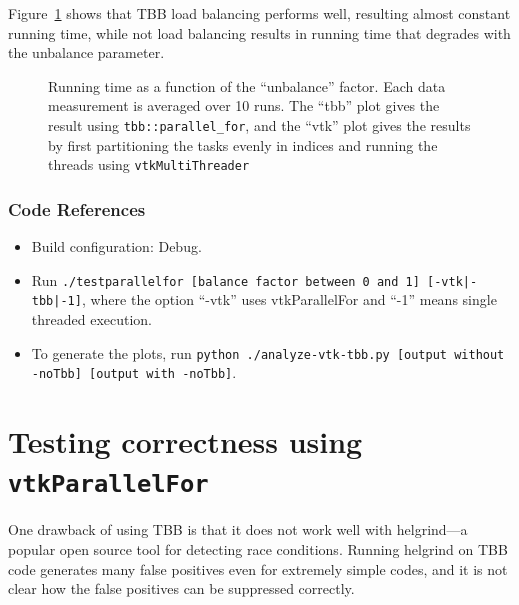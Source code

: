 \documentclass{article}
\begin{document}
Figure~\ref{fig:unbalance} shows that TBB load balancing performs
well, resulting almost constant running time, while not load balancing
results in running time that degrades with the unbalance parameter.
\begin{figure}[H]
\caption{Running time as a function of the ``unbalance'' factor.  Each
  data measurement is averaged over 10 runs. The ``tbb'' plot gives
  the result using {\tt tbb::parallel\_for}, and the ``vtk'' plot
  gives the results by first partitioning the tasks evenly in indices
  and running the threads using \texttt{vtkMultiThreader}}
\label{fig:unbalance}
\end{figure}

\subsubsection*{Code References}
\begin{itemize}
\item Build configuration: Debug.
\item Run {\tt ./testparallelfor [balance factor between 0 and 1]
  [-vtk|-tbb|-1]}, where the option ``-vtk'' uses vtkParallelFor and
  ``-1'' means single threaded execution.
\item To generate the plots, run {\tt python ./analyze-vtk-tbb.py [output without -noTbb] [output with -noTbb]}.
\end{itemize}


\section{Testing correctness using {\tt vtkParallelFor}}

One drawback of using TBB is that it does not work well with
helgrind---a popular open source tool for detecting race
conditions. Running helgrind on TBB code generates many false positives
even for extremely simple codes, and it is not clear how the false
positives can be suppressed correctly.
\end{document}
